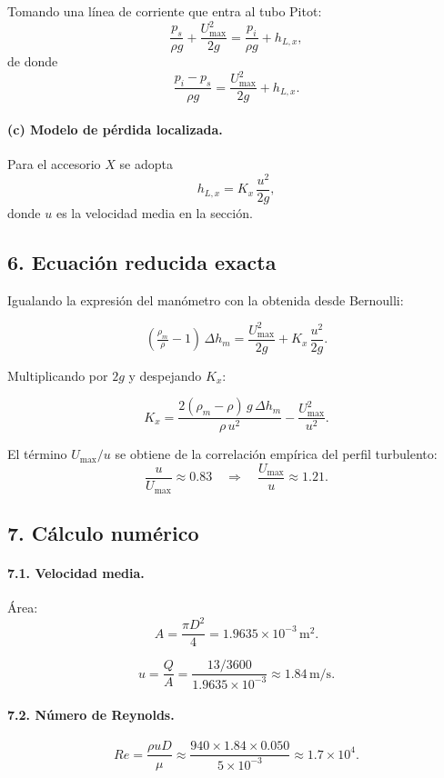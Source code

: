 \documentclass[12pt, a4paper]{article}
\begin{document}
Tomando una línea de corriente que entra al tubo Pitot:
\[
\frac{p_s}{\rho g} + \frac{U_{\max}^2}{2g}
=
\frac{p_i}{\rho g} + h_{L,x},
\]
de donde
\[
\frac{p_i - p_s}{\rho g} 
= \frac{U_{\max}^2}{2g} + h_{L,x}.
\]

\paragraph{(c) Modelo de pérdida localizada.}

Para el accesorio $X$ se adopta
\[
h_{L,x} = K_x\,\frac{u^{2}}{2g},
\]
donde $u$ es la velocidad media en la sección.


\subsection*{6. Ecuación reducida exacta}

Igualando la expresión del manómetro con la obtenida desde Bernoulli:

\[
(\tfrac{\rho_m}{\rho}-1)\,\Delta h_m
=
\frac{U_{\max}^2}{2g} + K_x\,\frac{u^{2}}{2g}.
\]

Multiplicando por $2g$ y despejando $K_x$:

\[
K_x = 
\frac{2(\rho_m-\rho)\,g\,\Delta h_m}{\rho\,u^{2}}
-
\frac{U_{\max}^2}{u^{2}}.
\]

El término $U_{\max}/u$ se obtiene de la correlación empírica del perfil turbulento:
\[
\frac{u}{U_{\max}} \approx 0.83 
\quad\Rightarrow\quad 
\frac{U_{\max}}{u} \approx 1.21.
\]


\subsection*{7. Cálculo numérico}

\paragraph{7.1. Velocidad media.}

Área:
\[
A = \frac{\pi D^2}{4}
  = 1.9635\times 10^{-3}\,\text{m}^2.
\]

\[
u = \frac{Q}{A}
  = \frac{13/3600}{1.9635\times 10^{-3}}
  \approx 1.84\,\text{m/s}.
\]

\paragraph{7.2. Número de Reynolds.}

\[
Re = \frac{\rho u D}{\mu}
    \approx \frac{940\times 1.84\times 0.050}{5\times 10^{-3}}
    \approx 1.7\times 10^{4}.
\]
\end{document}

